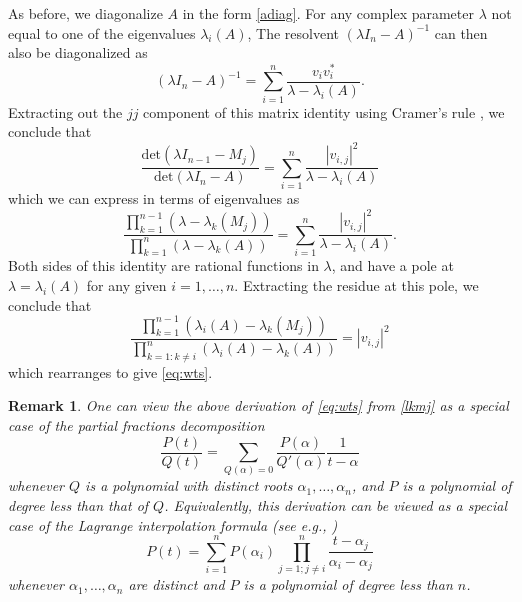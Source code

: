 \documentclass[12pt]{amsart}
\newtheorem{remark}[lemma]{Remark}
\begin{document}
As before, we diagonalize $A$ in the form \eqref{adiag}.  For any complex parameter $\lambda$ not equal to one of the eigenvalues $\lambda_i(A)$, The resolvent $(\lambda I_n - A)^{-1}$ can then also be diagonalized as
\begin{equation}\label{res}
 (\lambda I_n - A)^{-1} = \sum_{i=1}^n \frac{v_i v_i^*}{\lambda - \lambda_i(A)}.
\end{equation}
Extracting out the $jj$ component of this matrix identity using Cramer's rule \cite{cramer}, we conclude that
$$ \frac{\mathrm{det}(\lambda I_{n-1} - M_j)}{\mathrm{det}(\lambda I_n - A)} = \sum_{i=1}^n \frac{|v_{i,j}|^2}{\lambda - \lambda_i(A)}$$
which we can express in terms of eigenvalues as
\begin{equation}\label{lkmj}
 \frac{\prod_{k=1}^{n-1} (\lambda - \lambda_k(M_j))}{\prod_{k=1}^n (\lambda - \lambda_k(A))} = \sum_{i=1}^n \frac{|v_{i,j}|^2}{\lambda - \lambda_i(A)}.
\end{equation}
Both sides of this identity are rational functions in $\lambda$, and have a pole at $\lambda = \lambda_i(A)$ for any given $i=1,\dots,n$.  Extracting the residue at this pole, we conclude that
$$ \frac{\prod_{k=1}^{n-1} (\lambda_i(A) - \lambda_k(M_j))}{\prod_{k=1: k \neq i}^n (\lambda_i(A) - \lambda_k(A))} = |v_{i,j}|^2$$
which rearranges to give \eqref{eq:wts}.

\begin{remark}  One can view the above derivation of \eqref{eq:wts} from \eqref{lkmj} as a special case of the partial fractions decomposition
$$ \frac{P(t)}{Q(t)} = \sum_{Q(\alpha)=0} \frac{P(\alpha)}{Q'(\alpha)} \frac{1}{t-\alpha}$$
whenever $Q$ is a polynomial with distinct roots $\alpha_1,\dots,\alpha_n$, and $P$ is a polynomial of degree less than that of $Q$.  Equivalently, this derivation can be viewed as a special case of the Lagrange interpolation formula (see e.g., \cite[\S 25.2]{AS})
$$ P(t) = \sum_{i=1}^n P(\alpha_i) \prod_{j=1; j \neq i}^n \frac{t - \alpha_j}{\alpha_i-\alpha_j} $$
whenever $\alpha_1,\dots,\alpha_n$ are distinct and $P$ is a polynomial of degree less than $n$.
\end{remark}
\end{document}

